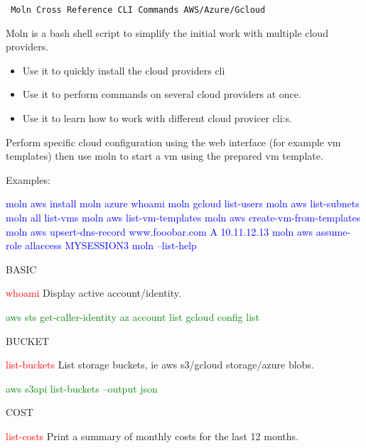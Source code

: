 \documentclass{article}
\newcommand{\cmd}[1]{\textcolor{Red}{#1}}
\newcommand{\help}[1]{#1\par}
\newcommand{\cloud}[1]{\textcolor{Green}{#1}}
\begin{document}
\tt
    {\Large Moln Cross Reference CLI Commands AWS/Azure/Gcloud}

    Moln is a bash shell script to simplify the initial work with multiple cloud providers.

    \begin{itemize}
    \item{Use it to quickly install the cloud providers cli}
    \item{Use it to perform commands on several cloud providers at once.}
    \item{Use it to learn how to work with different cloud provicer cli:s.}
    \end{itemize}

    Perform specific cloud configuration using the web interface (for example vm templates)
    then use moln to start a vm using the prepared vm template.

    Examples:

    \textcolor{Blue}{moln aws install} \linebreak
    \textcolor{Blue}{moln azure whoami} \linebreak
    \textcolor{Blue}{moln gcloud list-users} \linebreak
    \textcolor{Blue}{moln aws list-subnets} \linebreak
    \textcolor{Blue}{moln all list-vms} \linebreak
    \textcolor{Blue}{moln aws list-vm-templates} \linebreak
    \textcolor{Blue}{moln aws create-vm-from-templates} \linebreak
    \textcolor{Blue}{moln aws upsert-dns-record www.fooobar.com A 10.11.12.13} \linebreak
    \textcolor{Blue}{moln aws assume-role allaccess MYSESSION3} \linebreak
    \textcolor{Blue}{moln --list-help} \linebreak
    \par{\large BASIC}\par
\cmd{whoami} \help{Display active account/identity.}
\cloud{aws sts get-caller-identity}
\cloud{az account list}
\cloud{gcloud config list}

{\large BUCKET}\par
\cmd{list-buckets} \help{List storage buckets, ie aws s3/gcloud storage/azure blobs.}
\cloud{aws s3api list-buckets --output json}

{\large COST}\par
\cmd{list-costs} \help{Print a summary of monthly costs for the last 12 months.}
\end{document}
